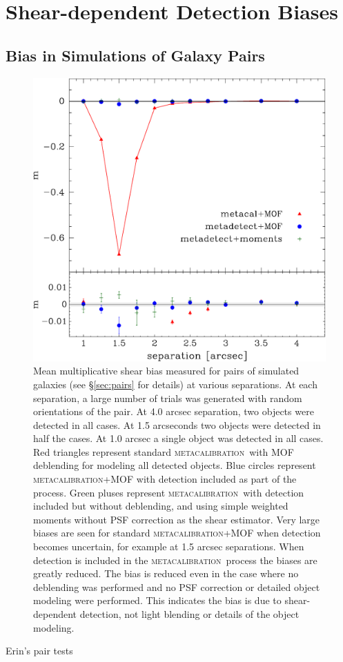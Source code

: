 \documentclass[fleqn,useAMS,usenatbib]{mnras}
\newcommand{\mcal}{\textsc{metacalibration}}
\begin{document}
\section{Shear-dependent Detection Biases}

\subsection{Bias in Simulations of Galaxy Pairs}

\begin{figure}
    \includegraphics[width=\columnwidth]{figures/pairs-mc-bdkpair.pdf}

    \caption{ Mean multiplicative shear bias measured for pairs of simulated
    galaxies (see \S \ref {sec:pairs} for details) at various separations.  At
    each separation, a large number of trials was generated with random
    orientations of the pair.  At 4.0 arcsec separation, two objects were
    detected in all cases.  At 1.5 arcseconds two objects were detected in half
    the cases.  At 1.0 arcsec a single object was detected in all cases.  Red
    triangles represent standard \mcal\ with MOF deblending for modeling all
    detected objects.  Blue circles represent \mcal+MOF with detection included
    as part of the process.  Green pluses represent \mcal\ with detection
    included but without deblending, and using simple weighted moments without
    PSF correction as the shear estimator. Very large biases are seen for
    standard \mcal+MOF when detection becomes uncertain, for example at 1.5
    arcsec separations.  When detection is included in the \mcal\ process the
    biases are greatly reduced.  The bias is reduced even in the case where no
    deblending was performed and no PSF correction or detailed object modeling
    were performed.  This indicates the bias is due to shear-dependent
    detection, not light blending or details of the object modeling.
    \label{fig:pairbias}}

\end{figure}
Erin's pair tests
\end{document}
